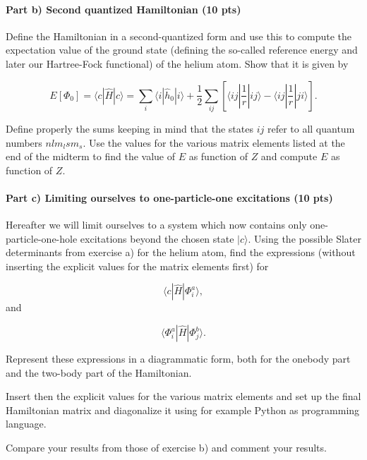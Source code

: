 \documentclass[a4wide,10pt]{article}
\begin{document}
\paragraph{Part b) Second quantized Hamiltonian (10 pts)}
Define the Hamiltonian in a second-quantized form and use this to
compute the expectation value of the ground state (defining the
so-called reference energy and later our Hartree-Fock functional) of
the helium atom.  Show that it is given by

\begin{equation*}
  E[\Phi_0] = \langle c | \hat{H}| c \rangle 
  = \sum_{i} \langle i | \hat{h}_0 | i\rangle+ \frac{1}{2}\sum_{ij}\left[\langle ij |\frac{1}{r}|ij\rangle-\langle ij |\frac{1}{r}|ji\rangle\right].
\end{equation*}

Define properly the sums keeping in mind that the states $ij$ refer to
all quantum numbers $nlm_lsm_s$.  Use the values for the various
matrix elements listed at the end of the midterm to find the value of
$E$ as function of $Z$ and compute $E$ as function of $Z$.

\paragraph{Part c) Limiting ourselves to one-particle-one excitations (10 pts)}
Hereafter we will limit ourselves to a system which now contains only
one-particle-one-hole excitations beyond the chosen state $|c\rangle$.
Using the possible Slater determinants from exercise a) for the helium
atom, find the expressions (without inserting the explicit values for
the matrix elements first) for

\begin{equation*}
\langle c | \hat{H}| \Phi_i^a \rangle,
\end{equation*}
and

\begin{equation*}
\langle \Phi_i^a | \hat{H}| \Phi_j^b \rangle.
\end{equation*}

Represent these expressions in a diagrammatic form, both for the
onebody part and the two-body part of the Hamiltonian.

Insert then the explicit values for the various matrix elements and
set up the final Hamiltonian matrix and diagonalize it using for
example Python as programming language. 

Compare your results from those of exercise b) and comment your results. 
\end{document}
